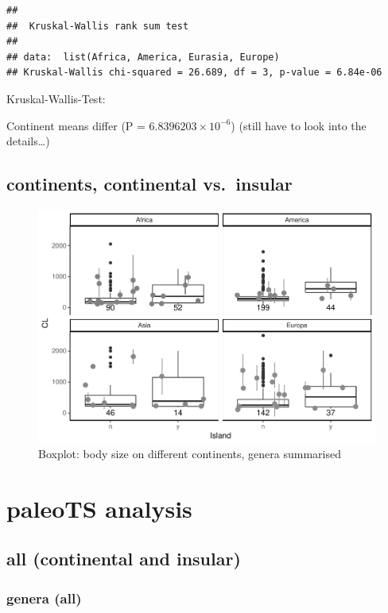 \documentclass[]{article}
\begin{document}
\begin{verbatim}
## 
##  Kruskal-Wallis rank sum test
## 
## data:  list(Africa, America, Eurasia, Europe)
## Kruskal-Wallis chi-squared = 26.689, df = 3, p-value = 6.84e-06
\end{verbatim}

Kruskal-Wallis-Test:

Continent means differ (P = \(6.8396203\times 10^{-6}\)) (still have to
look into the details\ldots{})

\newpage

\subsection{continents, continental
vs.~insular}\label{continents-continental-vs.insular}

\begin{figure}[htbp]
\centering
\includegraphics{MA_JJ_files/figure-latex/BPConCI-1.pdf}
\caption{Boxplot: body size on different continents, genera summarised}
\end{figure}

\newpage

\section{paleoTS analysis}\label{paleots-analysis}

\subsection{all (continental and
insular)}\label{all-continental-and-insular}

\subsubsection{genera (all)}\label{genera-all}
\end{document}
